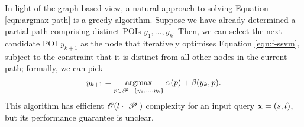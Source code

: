 
In light of the graph-based view, a natural approach to solving Equation \ref{eqn:argmax-path} is a greedy algorithm.
Suppose we have already determined a partial path comprising distinct POIs $y_1, \ldots, y_k$.
Then, we can select the next candidate POI $y_{k + 1}$ as
the node
that iteratively optimises Equation \ref{eqn:f-ssvm},
subject to the constraint that it is distinct from all other nodes in the current path;
formally, we can pick
$$ y_{k + 1} = \operatorname*{argmax}_{p \in \mathscr{P} - \{ y_1, \ldots, y_k \}} \alpha( p ) + \beta( y_k, p ). $$
This algorithm has efficient $\mathscr{O}(l \cdot | \mathscr{P} |)$ complexity for an input query $\mathbf{x} = (s, l)$,
but its performance guarantee is unclear.
